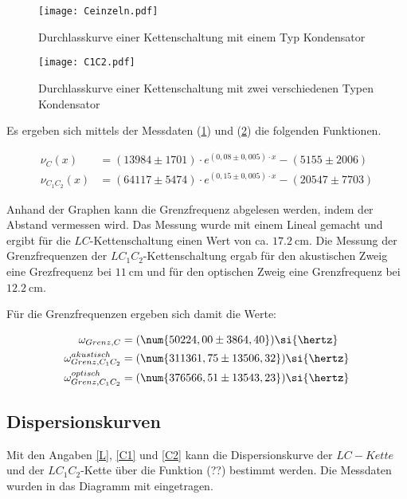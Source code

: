 \begin{figure}
  \texttt{[image: Ceinzeln.pdf]}
  \caption{Durchlasskurve einer Kettenschaltung mit einem Typ Kondensator}
  \label{fig:Ceinzeln}
\end{figure}

\begin{figure}
  \texttt{[image: C1C2.pdf]}
  \caption{Durchlasskurve einer Kettenschaltung mit zwei verschiedenen Typen Kondensator}
  \label{fig:C1C2}
\end{figure}

Es ergeben sich mittels der Messdaten (\ref{fig:Ceinzeln}) und (\ref{fig:C1C2})
die folgenden Funktionen.

\begin{align}
  \label{eqn:Ausgleichsrechnung_exp_1}
  \nu_{C}(x) &= (13984\pm 1701)\cdot e^{(0,08\pm 0,005)\cdot x} - (5155\pm 2006) \\
  \label{eqn:Ausgleichsrechnung_exp_2}
  \nu_{C_1C_2}(x) &= (64117\pm 5474)\cdot e^{(0,15\pm 0,005)\cdot x}-(20547\pm 7703)
\end{align}

Anhand der Graphen kann die Grenzfrequenz abgelesen werden, indem der
Abstand vermessen wird. Das Messung wurde mit einem Lineal gemacht
und ergibt für die $LC$-Kettenschaltung einen Wert von ca.
$\SI{17,2}{\centi\meter}$. Die Messung der Grenzfrequenzen der
$LC_1C_2$-Kettenschaltung ergab für den akustischen Zweig eine
Grezfrequenz bei $\SI{11}{\centi\meter}$ und für den optischen Zweig eine
Grenzfrequenz bei  $\SI{12,2}{\centi\meter}$.

Für die Grenzfrequenzen ergeben sich damit die Werte:

\begin{align}
  \omega_{Grenz,C} &= (\num{50224,00\pm 3864,40})\si{\hertz}\\
  \omega_{Grenz,C_1C_2}^{akustisch} &= (\num{311361,75\pm 13506,32})\si{\hertz}\\
  \omega_{Grenz,C_1C_2}^{optisch} &= (\num{376566,51\pm 13543,23})\si{\hertz}
\end{align}

\subsection{Dispersionskurven}

Mit den Angaben \eqref{L}, \eqref{C1} und \eqref{C2} kann die Dispersionskurve
der $LC-Kette$ und der $LC_1C_2$-Kette über die Funktion (??) bestimmt werden.
Die Messdaten wurden in das Diagramm mit eingetragen.

